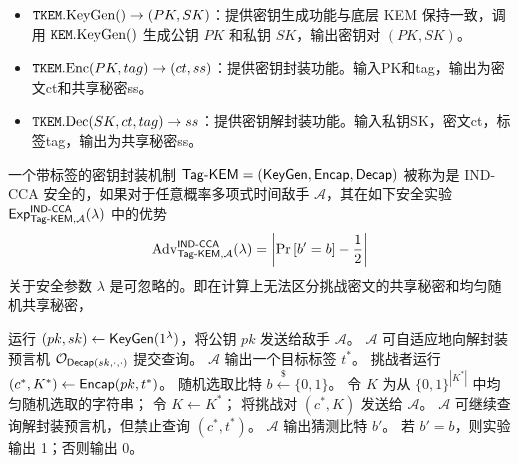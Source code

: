 \begin{itemize}
  \item $\texttt{TKEM}.\text{KeyGen}() \rightarrow (PK, SK) $：提供密钥生成功能与底层 KEM 保持一致，调用 $\texttt{KEM}.\text{KeyGen}()$ 生成公钥 $PK$ 和私钥 $SK$，输出密钥对 $(PK, SK)$。
  
  \item $\texttt{TKEM}.\text{Enc}(PK, tag) \rightarrow (ct, ss) $：提供密钥封装功能。输入PK和tag，输出为密文ct和共享秘密ss。
  
  \item $\texttt{TKEM}.\text{Dec}(SK, ct, tag) \rightarrow ss$：提供密钥解封装功能。输入私钥SK，密文ct，标签tag，输出为共享秘密ss。
\end{itemize}
\begin{definition}
一个带标签的密钥封装机制 $\mathsf{Tag\text{-}KEM} = (\mathsf{KeyGen}, \mathsf{Encap}, \mathsf{Decap})$ 被称为是 IND-CCA 安全的，如果对于任意概率多项式时间敌手 $\mathcal{A}$，其在如下安全实验 $\mathsf{Exp}_{\TagKEM,\mathcal{A}}^{\mathsf{IND\text{-}CCA}}(\lambda)$ 中的优势
\[
\mathrm{Adv}_{\mathsf{Tag\text{-}KEM},\mathcal{A}}^{\mathsf{IND\text{-}CCA}}(\lambda)
= \left| \Pr\left[ b' = b \right] - \frac{1}{2} \right|
\]
关于安全参数 $\lambda$ 是可忽略的。即在计算上无法区分挑战密文的共享秘密和均匀随机共享秘密，
\end{definition}



\begin{algorithm}[H]
\caption{安全实验 $\mathsf{Exp}_{\TagKEM,\mathcal{A}}^{\mathsf{IND\text{-}CCA}}(\lambda)$}
\begin{algorithmic}[1]
\State 运行 $(pk, sk) \gets \mathsf{KeyGen}(1^\lambda)$，将公钥 $pk$ 发送给敌手 $\mathcal{A}$。
\State $\mathcal{A}$ 可自适应地向解封装预言机 $\mathcal{O}_{\mathsf{Decap}(sk,\cdot,\cdot)}$ 提交查询。
\State $\mathcal{A}$ 输出一个目标标签 $t^*$。
\State 挑战者运行 $(c^*, K^*) \gets \mathsf{Encap}(pk, t^*)$。
\State 随机选取比特 $b \xleftarrow{\$} \{0,1\}$。
    \State 令 $K$ 为从 $\{0,1\}^{|K^*|}$ 中均匀随机选取的字符串；
\Else
    \State 令 $K \gets K^*$；
\EndIf
\State 将挑战对 $(c^*, K)$ 发送给 $\mathcal{A}$。
\State $\mathcal{A}$ 可继续查询解封装预言机，但禁止查询 $(c^*, t^*)$。
\State $\mathcal{A}$ 输出猜测比特 $b'$。
\State 若 $b' = b$，则实验输出 1；否则输出 0。
\end{algorithmic}
\end{algorithm}

\noindent
